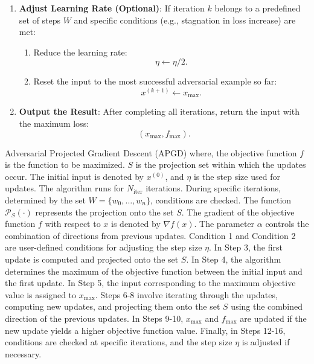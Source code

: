 \begin{enumerate}
    \item \textbf{Adjust Learning Rate (Optional)}:  
    If iteration $k$ belongs to a predefined set of steps $W$ and specific conditions (e.g., stagnation in loss increase) are met:  
    \begin{enumerate}
        \item Reduce the learning rate:  
        \[
        \eta \gets \eta / 2.
        \]
        \item Reset the input to the most successful adversarial example so far:  
        \[
        x^{(k+1)} \gets x_{\text{max}}.
        \]
    \end{enumerate}

    \item \textbf{Output the Result}:  
    After completing all iterations, return the input with the maximum loss:  
    \[
    (x_{\text{max}}, f_{\text{max}}).
    \]
\end{enumerate}

Adversarial Projected Gradient Descent (APGD) where, the objective function $f$ is the function to be maximized. $S$ is the projection set within which the updates occur. The initial input is denoted by $x^{(0)}$, and $\eta$ is the step size used for updates. The algorithm runs for $N_{\text{iter}}$ iterations. During specific iterations, determined by the set $W = \{w_0, \ldots, w_n\}$, conditions are checked. The function $\mathcal{P}_S(\cdot)$ represents the projection onto the set $S$. The gradient of the objective function $f$ with respect to $x$ is denoted by $\nabla f(x)$. The parameter $\alpha$ controls the combination of directions from previous updates. Condition 1 and Condition 2 are user-defined conditions for adjusting the step size $\eta$.
In Step 3, the first update is computed and projected onto the set $S$. In Step 4, the algorithm determines the maximum of the objective function between the initial input and the first update. In Step 5, the input corresponding to the maximum objective value is assigned to $x_{\text{max}}$. Steps 6-8 involve iterating through the updates, computing new updates, and projecting them onto the set $S$ using the combined direction of the previous updates. In Steps 9-10, $x_{\text{max}}$ and $f_{\text{max}}$ are updated if the new update yields a higher objective function value. Finally, in Steps 12-16, conditions are checked at specific iterations, and the step size $\eta$ is adjusted if necessary.